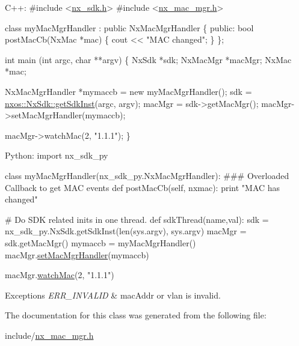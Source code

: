 \begin{DoxyCode}
C++:
\textcolor{preprocessor}{     #include <\mbox{\hyperlink{nx__sdk_8h}{nx\_sdk.h}}>}
\textcolor{preprocessor}{     #include <\mbox{\hyperlink{nx__mac__mgr_8h}{nx\_mac\_mgr.h}}>}

     \textcolor{keyword}{class }myMacMgrHandler : \textcolor{keyword}{public} NxMacMgrHandler \{
        \textcolor{keyword}{public}:
           \textcolor{keywordtype}{bool} postMacCb(NxMac *mac) \{
                cout << \textcolor{stringliteral}{"MAC changed"};
           \}
     \};

     \textcolor{keywordtype}{int}  main (\textcolor{keywordtype}{int} argc, \textcolor{keywordtype}{char} **argv)
     \{
          NxSdk    *sdk;
          NxMacMgr *macMgr;
          NxMac    *mac;

          NxMacMgrHandler *mymaccb = \textcolor{keyword}{new} myMacMgrHandler();
          sdk = \mbox{\hyperlink{classnxos_1_1_nx_sdk_a5050e2d26c40744b4fc7862068a83f39}{nxos::NxSdk::getSdkInst}}(argc, argv);
          macMgr = sdk->getMacMgr();
          macMgr->setMacMgrHandler(mymaccb);

          macMgr->watchMac(2, \textcolor{stringliteral}{"1.1.1"});
     \}

Python:
   \textcolor{keyword}{import} nx\_sdk\_py

   \textcolor{keyword}{class }myMacMgrHandler(nx\_sdk\_py.NxMacMgrHandler):
\textcolor{preprocessor}{   ### Overloaded Callback to get MAC events}
         def postMacCb(self, nxmac):
             print "MAC has changed"

\textcolor{preprocessor}{   # Do SDK related inits in one thread.}
   def sdkThread(name,val):
       sdk = nx\_sdk\_py.NxSdk.getSdkInst(len(sys.argv), sys.argv)
       macMgr = sdk.getMacMgr()
       mymaccb = myMacMgrHandler()
       macMgr.\mbox{\hyperlink{classnxos_1_1_nx_mac_mgr_a06f53bd41ddb17e6cfaef5a02b00415d}{setMacMgrHandler}}(mymaccb)

       macMgr.\mbox{\hyperlink{classnxos_1_1_nx_mac_mgr_a12dde38c22d9a27e1e3bde318d418134}{watchMac}}(2, "1.1.1")
\end{DoxyCode}



\begin{DoxyExceptions}{Exceptions}
{\em E\+R\+R\+\_\+\+I\+N\+V\+A\+L\+ID} & mac\+Addr or vlan is invalid. \\
\hline
\end{DoxyExceptions}


The documentation for this class was generated from the following file\+:\begin{DoxyCompactItemize}
\item 
include/\mbox{\hyperlink{nx__mac__mgr_8h}{nx\+\_\+mac\+\_\+mgr.\+h}}\end{DoxyCompactItemize}
